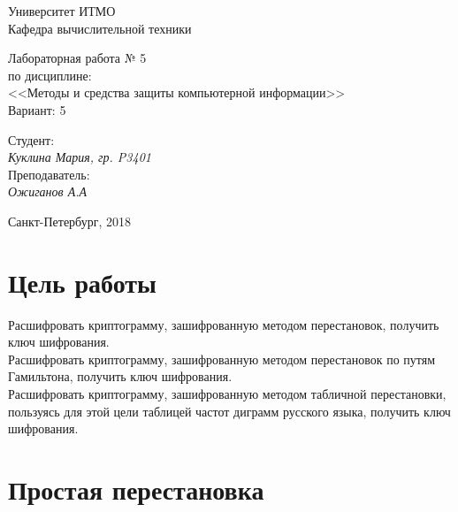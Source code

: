 \documentclass[12pt, a4paper] {ncc}
\begin{document}
\setcounter{figure}{0}
\frenchspacing
\pagestyle{empty}
\begin{center}
                            Университет ИТМО    \\
                        Кафедра вычислительной техники

						Лабораторная работа № 5 \\
				по дисциплине: \\
				<<Методы и средства защиты компьютерной информации>>\\
Вариант: 5
\end{center}
\begin{center}

\end{center}
\begin{flushright}
                                    Студент:\\
                                    {\it Куклина Мария, гр. P3401}\\
                                    Преподаватель: \\
                                    {\it Ожиганов А.А}
\end{flushright}
\begin{center}
                             Санкт-Петербург, 2018
\end{center}
\newpage

\section{Цель работы}

Расшифровать криптограмму, зашифрованную методом перестановок, получить ключ
шифрования.\\
Расшифровать криптограмму, зашифрованную методом перестановок
по путям Гамильтона, получить ключ шифрования. \\
 Расшифровать криптограмму, зашифрованную методом табличной перестановки, пользуясь для этой цели
таблицей частот диграмм русского языка, получить ключ шифрования.

\section{Простая перестановка}
\end{document}
